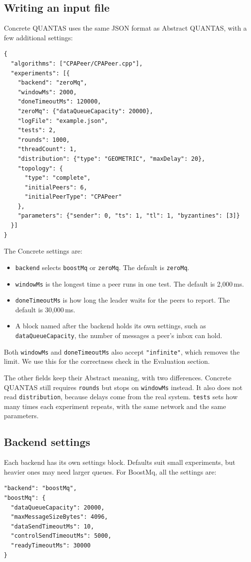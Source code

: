 \documentclass[11pt,a4paper]{article}
\newcommand{\code}[1]{\texttt{#1}}
\begin{document}
\subsection{Writing an input file}

Concrete QUANTAS uses the same JSON format as Abstract QUANTAS, with a few additional settings:
\begin{lstlisting}
{
  "algorithms": ["CPAPeer/CPAPeer.cpp"],
  "experiments": [{
    "backend": "zeroMq",
    "windowMs": 2000,
    "doneTimeoutMs": 120000,
    "zeroMq": {"dataQueueCapacity": 20000},
    "logFile": "example.json",
    "tests": 2,
    "rounds": 1000,
    "threadCount": 1,
    "distribution": {"type": "GEOMETRIC", "maxDelay": 20},
    "topology": {
      "type": "complete",
      "initialPeers": 6,
      "initialPeerType": "CPAPeer"
    },
    "parameters": {"sender": 0, "ts": 1, "tl": 1, "byzantines": [3]}
  }]
}
\end{lstlisting}
The Concrete settings are:
\begin{itemize}
  \item \code{backend} selects \code{boostMq} or \code{zeroMq}. The default is \code{zeroMq}.
  \item \code{windowMs} is the longest time a peer runs in one test. The default is 2,000\,ms.
  \item \code{doneTimeoutMs} is how long the leader waits for the peers to report. The default is
    30,000\,ms.
  \item A block named after the backend holds its own settings, such as \code{dataQueueCapacity},
    the number of messages a peer's inbox can hold.
\end{itemize}
Both \code{windowMs} and \code{doneTimeoutMs} also accept \code{"infinite"}, which removes the limit.
We use this for the correctness check in the Evaluation section.

The other fields keep their Abstract meaning, with two differences. Concrete QUANTAS still requires
\code{rounds} but stops on \code{windowMs} instead. It also does not read \code{distribution},
because delays come from the real system. \code{tests} sets how many times each experiment repeats,
with the same network and the same parameters.

\subsection{Backend settings}

Each backend has its own settings block. Defaults suit small experiments, but heavier ones may need
larger queues. For BoostMq, all the settings are:
\begin{lstlisting}
"backend": "boostMq",
"boostMq": {
  "dataQueueCapacity": 20000,
  "maxMessageSizeBytes": 4096,
  "dataSendTimeoutMs": 10,
  "controlSendTimeoutMs": 5000,
  "readyTimeoutMs": 30000
}
\end{lstlisting}
\end{document}
